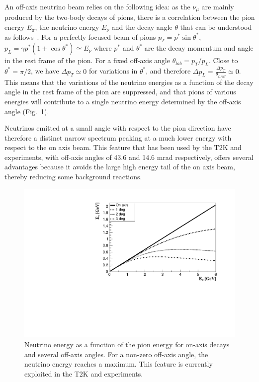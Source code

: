 An off-axis neutrino beam \cite{1995bnl} relies on the following idea: as the $\nu_\mu$ are mainly produced by the two-body decays of pions, there is a correlation between the pion energy $E_\pi$, the neutrino energy $E_\nu$ and the decay angle $\theta$ 
that can be understood as follows~\cite{nakaya}. For a perfectly focused beam of pions
$p_T = p^* \sin \theta^*$, $p_L = \gamma p^* (1 + \cos \theta^* ) \simeq E_\nu$
where $p^*$ and $θ^*$ are the decay momentum and angle in the rest frame of the pion. For a fixed off-axis angle $\theta_{lab} = p_T /p_L$.
Close to $\theta^* = \pi/2$, we have $\Delta p_T \simeq 0 $ for variations in $\theta^*$, and therefore $\Delta p_L = \frac{\Delta p_T}{\theta_{LAB}} \simeq 0$. This means that the variations of the neutrino energies as a function of the decay angle in the rest frame of the pion are suppressed, and that pions of various energies will contribute to a single neutrino energy determined by the off-axis angle (Fig.~\ref{fig:offaxis}).


Neutrinos emitted at a small angle with respect to the pion direction have therefore a distinct narrow spectrum peaking at a much lower energy with respect to the on axis beam. This feature that has been used by the T2K and \nova experiments, with off-axis angles of 43.6 and 14.6 mrad respectively, offers several advantages because it avoids the large high energy tail of the on axis beam, thereby reducing some background reactions. 

\begin{figure}[htbp]
\centering
\includegraphics[width=0.6\linewidth]{figures/offaxis.pdf}
  \caption{Neutrino energy as a function of the pion energy for on-axis decays and several off-axis angles. For a non-zero off-axis angle, the neutrino energy reaches a maximum. This feature is currently exploited in the T2K and \nova experiments.}
 \label{fig:offaxis}
 \end{figure}


